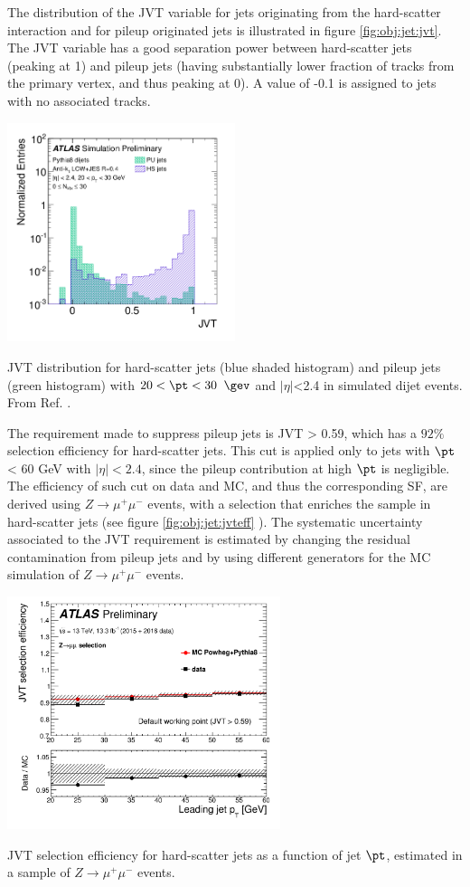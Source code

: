 The distribution of the JVT variable for jets originating from the hard-scatter interaction and for pileup originated jets is illustrated in figure \ref{fig:obj:jet:jvt}. The JVT variable has a good separation power between hard-scatter jets (peaking at 1) and pileup jets (having substantially lower fraction of tracks from the primary vertex, and thus peaking at 0). A value of -0.1 is assigned to jets with no associated tracks.

\bfig[t!]
\centering
\includegraphics[width=0.5\textwidth]{figures/Objects/jvt.png}
\captionsetup{width=0.85\textwidth} \caption{\small JVT distribution for hard-scatter jets (blue shaded histogram) and pileup jets (green histogram) with $20<\pt<30$ $\gev$ and $|\eta|$<2.4 in simulated dijet events. From Ref. \cite{ATLAS-CONF-2014-018}.}
\label{fig:obj:jet:jvt}
\efig

The requirement made to suppress pileup jets is JVT > 0.59, which has a $92\%$ selection efficiency for hard-scatter jets. This cut is applied only to jets with $\pt$ < 60 GeV with $|\eta|<2.4$, since the pileup contribution at high $\pt$ is negligible. The efficiency of such cut on data and MC, and thus the corresponding SF, are derived using $Z\to \mu^{+}\mu^{-}$ events, with a selection that enriches the sample in hard-scatter jets (see figure \ref{fig:obj:jet:jvteff} ). The systematic uncertainty associated to the JVT requirement is estimated
by changing the residual contamination from pileup jets and by using different generators for the MC simulation of $Z\to \mu^{+}\mu^{-}$ events.

\bfig[h!]
\centering
\includegraphics[width=0.6\textwidth]{figures/Objects/jvteff.png}
\captionsetup{width=0.85\textwidth} \caption{\small JVT selection efficiency for hard-scatter jets as a function of jet $\pt$, estimated in a sample of $Z\to \mu^{+}\mu^{-}$ events.}
\label{fig:obj:jet:jvteff}
\efig

